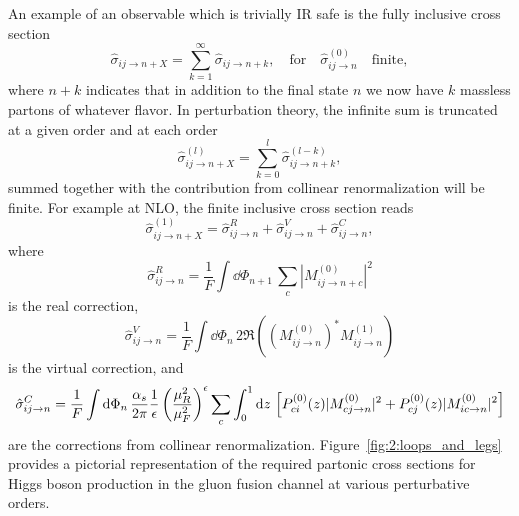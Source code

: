 An example of an observable which is trivially IR safe is the fully inclusive cross section
\begin{equation}
\hat{\sigma}_{ij \rightarrow n+X} = \sum_{k = 1}^\infty \hat{\sigma}_{ij \rightarrow n + k}, \quad \text{for} \quad \hat{\sigma}_{ij \rightarrow n}^{(0)} \quad \text{finite},
\end{equation}
where $n + k$ indicates that in addition to the final state $n$ we now have $k$ massless partons of whatever flavor. In perturbation theory, the infinite sum is truncated at a given order and at each order
\begin{equation}
\hat{\sigma}_{ij \rightarrow n+X}^{(l)} = \sum_{k = 0}^l \hat{\sigma}_{ij \rightarrow n + k}^{(l - k)},
\end{equation}
summed together with the contribution from collinear renormalization will be finite. For example at \acs{NLO}, the finite inclusive cross section reads
\begin{equation}
\hat{\sigma}_{ij \rightarrow n+X}^{(1)} = \hat{\sigma}_{ij \rightarrow n}^{R} + \hat{\sigma}_{ij \rightarrow n}^{V} + \hat{\sigma}_{ij \rightarrow n}^C,
\end{equation}
where
\begin{equation}
\hat{\sigma}_{ij \rightarrow n}^R = \frac{1}{F}\int \dd \Phi_{n + 1} \, \sum_c |M_{ij \rightarrow n + c}^{(0)}|^2
\end{equation}
is the real correction,
\begin{equation}
\hat{\sigma}_{ij \rightarrow n}^V = \frac{1}{F} \int \dd \Phi_n \, 2 \Re \left( \left(M_{ij \rightarrow n}^{(0)}\right)^* M_{ij \rightarrow n}^{(1)} \right)
\end{equation}
is the virtual correction, and
\begin{equation}
\hat{\sigma}_{ij \rightarrow n}^C = \frac{1}{F} \int \mathrm{d} \Phi_n \, \frac{\alpha_s}{2 \pi} \frac{1}{\epsilon} \left(\frac{\mu_R^2}{\mu_F^2} \right)^\epsilon \sum_c \int_0^1 \mathrm{d} z\,  \left[ P_{ci}^{(0)}(z) |M_{cj \rightarrow n}^{(0)}|^2 + P_{cj}^{(0)}(z) |M_{ic \rightarrow n}^{(0)}|^2 \right]
\end{equation}
are the corrections from collinear renormalization. Figure~\ref{fig:2:loops_and_legs} provides a pictorial representation of the required partonic cross sections for Higgs boson production in the gluon fusion channel at various perturbative orders.
